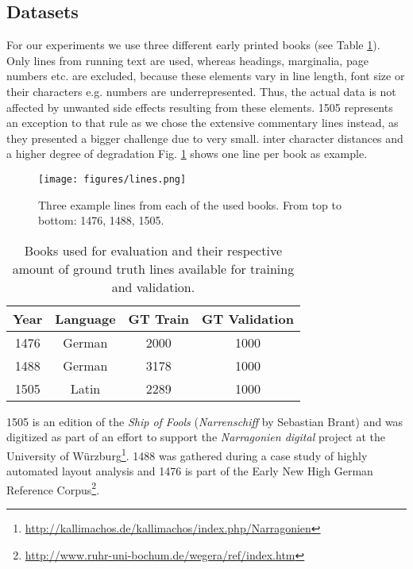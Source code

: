 \documentclass{jlcl}
\begin{document}
\subsection{Datasets}
For our experiments we use three different early printed books (see Table \ref{tab:books}).
Only lines from running text are used, whereas headings, marginalia, page numbers etc. are excluded, because these elements vary in line length, font size or their characters e.g. numbers are underrepresented.
Thus, the actual data is not affected by unwanted side effects resulting from these elements.
1505 represents an exception to that rule as we chose the extensive commentary lines instead, as they presented a bigger challenge due to very small. inter character distances and a higher degree of degradation
Fig. \ref{fig:lines} shows one line per book as example.

\begin{figure}[t]
\centering
\texttt{[image: figures/lines.png]}
\caption{Three example lines from each of the used books. From top to bottom: 1476, 1488, 1505.}
\label{fig:lines}
\end{figure}

\begin{table}[t]
\centering
\caption{Books used for evaluation and their respective amount of ground truth lines available for training and validation.}
\label{tab:books}
\begin{tabular}{cccc}
\hline
\textbf{Year} & \textbf{Language} & \textbf{GT Train} & \textbf{GT Validation} \\
\hline
1476             & German             & 2000              & 1000 \\
1488             & German             & 3178              & 1000 \\
1505             & Latin              & 2289              & 1000 \\
\hline
\end{tabular}
\end{table}
1505 is an edition of the \textit{Ship of Fools} (\textit{Narrenschiff} by Sebastian Brant) and was digitized as part of an effort to support the \textit{Narragonien digital} project at the University of Würzburg\footnote{\url{http://kallimachos.de/kallimachos/index.php/Narragonien}}.
1488 was gathered during a case study of highly automated layout analysis \cite{reul2017dhl} and 1476 is part of the Early New High German Reference Corpus\footnote{\url{http://www.ruhr-uni-bochum.de/wegera/ref/index.htm}}.
\end{document}

